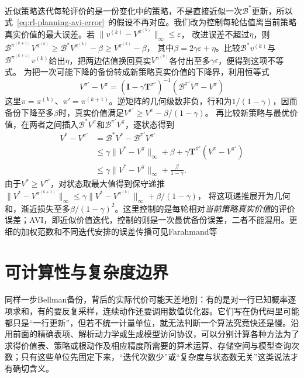 近似策略迭代每轮评价的是一份变化中的策略，不是直接近似一次$\mathcal B^*$更新，所以式~\eqref{eq:rl-planning-avi-error}~的假设不再对应。我们改为控制每轮估值离当前策略真实价值的最大误差。若
$\lVert v^{(k)}-V^{\pi^{(k)}}\rVert_\infty\leq\varepsilon$，
改进误差不超过$\eta$，则
$\mathcal B^{\pi^{(k+1)}}V^{\pi^{(k)}}\geq \mathcal B^*V^{\pi^{(k)}}-\beta
\geq V^{\pi^{(k)}}-\beta$，
其中$\beta=2\gamma\varepsilon+\eta$。比较$\mathcal B^*v^{(k)}$与$\mathcal B^{\pi^{(k+1)}}v^{(k)}$给出$\eta$，把两边估值换回真实$V^{\pi^{(k)}}$各付出至多$\gamma\varepsilon$，便得到这项不等式。
为把一次可能下降的备份转成新策略真实价值的下降界，利用恒等式
\[
 V^{\pi'}-V^\pi
 =(\bm I-\gamma\bm T^{\pi'})^{-1}(\mathcal B^{\pi'}V^\pi-V^\pi)
\]
这里$\pi=\pi^{(k)}$、$\pi'=\pi^{(k+1)}$。逆矩阵的几何级数非负，行和为$1/(1-\gamma)$，因而备份下降至多$\beta$时，真实价值满足$V^{\pi'}\geq V^\pi-\beta/(1-\gamma)$。
再比较新策略与最优价值，在两者之间插入$\mathcal B^*V^\pi$和$\mathcal B^{\pi'}V^\pi$，逐状态得到
\[
\begin{aligned}
 V^*-V^{\pi'}
 &=\mathcal B^*V^*-\mathcal B^{\pi'}V^{\pi'}\\
 &\leq\gamma\lVert V^*-V^\pi\rVert_\infty
       +\beta+\gamma\bm T^{\pi'}(V^\pi-V^{\pi'})\\
 &\leq\gamma\lVert V^*-V^\pi\rVert_\infty+\frac{\beta}{1-\gamma}.
\end{aligned}
\]
由于$V^*\geq V^{\pi'}$，对状态取最大值得到保守递推
$\lVert V^*-V^{\pi^{(k+1)}}\rVert_\infty
\leq\gamma\lVert V^*-V^{\pi^{(k)}}\rVert_\infty+\beta/(1-\gamma)$，
将这项递推展开为几何和，渐近损失至多$\beta/(1-\gamma)^2$。这里控制的是每轮相对\emph{当前策略真实价值}的评价误差；AVI，即近似价值迭代，控制的则是一次最优备份误差，二者不能混用。更细的加权范数和不同迭代安排的误差传播可见Farahmand等

\section{可计算性与复杂度边界}
\label{sec:rl-planning-complexity}

同样一步Bellman备份，背后的实际代价可能天差地别：有的是对一行已知概率逐项求和，有的要反复采样，连续动作还要调用数值优化器。它们写在伪代码里可能都只是“一行更新”，但若不统一计量单位，就无法判断一个算法究竟快还是慢。沿用前面的精确表项、解析动力学或生成模型访问协议，可以分别计算各种方法为了求得价值表、策略或根动作及相应精度所需要的算术运算、存储空间与模型查询次数；只有这些单位先固定下来，“迭代次数少”或“复杂度与状态数无关”这类说法才有确切含义。

